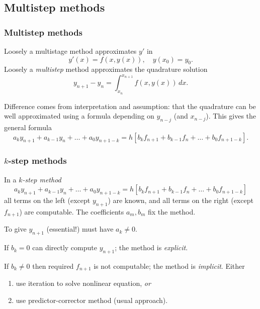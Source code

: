 \documentclass{beamer}
\begin{document}
\subsection{Multistep methods}

\begin{frame}
  \frametitle{Multistep methods}

  Loosely a multistage method approximates $y'$ in
  \begin{equation*}
    y'(x) = f(x, y(x)), \quad y(x_0) = y_0.
  \end{equation*}
  Loosely a \emph{multistep} method approximates the quadrature
  solution
  \begin{equation*}
    y_{n+1} - y_n = \int_{x_n}^{x_{n+1}} f(x, y(x)) \, d x.
  \end{equation*} \pause

  \vspace{1ex}

  Difference comes from interpretation and assumption: that the
  quadrature can be well approximated using a formula depending on
  $y_{n-j}$ (and $x_{n-j}$). This gives the general formula
  \begin{equation*}
    a_k y_{n+1} + a_{k-1} y_n + \dots + a_0 y_{n+1-k} = h \left[ b_k
      f_{n+1} + b_{k-1} f_n + \dots + b_0 f_{n+1-k} \right].
  \end{equation*}

\end{frame}

\begin{frame}
  \frametitle{\texorpdfstring{$k$-step methods}{k-step methods}}

  In a \emph{$k$-step method}
  \begin{equation*}
    a_k y_{n+1} + a_{k-1} y_n + \dots + a_0 y_{n+1-k} = h \left[ b_k
      f_{n+1} + b_{k-1} f_n + \dots + b_0 f_{n+1-k} \right]
  \end{equation*}
  all terms on the left (except $y_{n+1}$) are known, and all terms on
  the right (except $f_{n+1}$) are computable. The coefficients $a_m,
  b_m$ fix the method. \pause

  \vspace{1ex}

  To give $y_{n+1}$ (essential!) must have $a_k \neq 0$. \pause

  \vspace{1ex}

  If $b_k = 0$ can directly compute $y_{n+1}$; the method is
  \emph{explicit}. \pause

  \vspace{1ex}

  If $b_k \neq 0$ then required $f_{n+1}$ is not computable; the
  method is \emph{implicit}. Either
  \begin{enumerate}
  \item use iteration to solve nonlinear equation, \emph{or}
  \item use predictor-corrector method (usual approach).
  \end{enumerate}

\end{frame}
\end{document}

